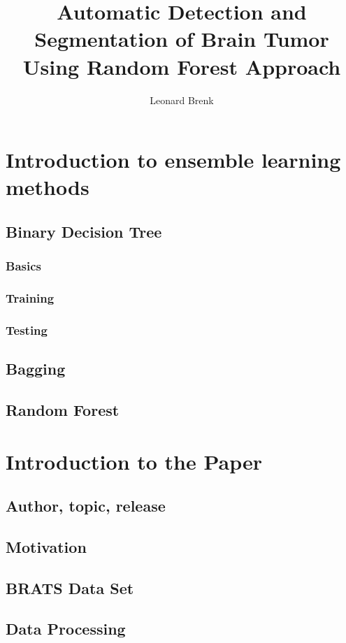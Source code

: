 \documentclass{article}
\title{Automatic Detection and Segmentation of Brain Tumor Using Random Forest Approach}
\author{Leonard Brenk}
\begin{document}
 \maketitle

 \newpage

 \tableofcontents

 \newpage

 \section{Introduction to ensemble learning methods}
 \subsection{Binary Decision Tree}
 \subsubsection{Basics}
 \subsubsection{Training}
 \subsubsection{Testing}
 \subsection{Bagging}
 \subsection{Random Forest}

 \section{Introduction to the Paper}
 \subsection{Author, topic, release}
 \subsection{Motivation}
 \subsection{BRATS Data Set}
 \subsection{Data Processing}
\end{document}
